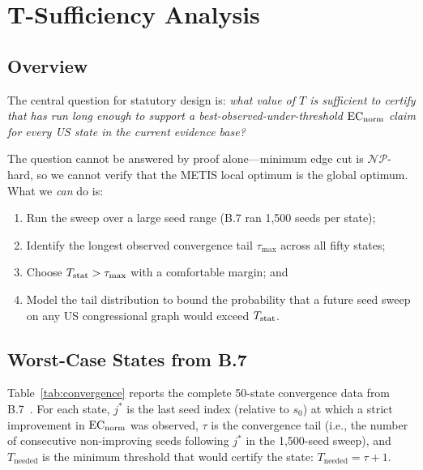 \section{T-Sufficiency Analysis}
\label{sec:sufficiency}

\subsection{Overview}

The central question for statutory design is: \emph{what value of $T$ is
sufficient to certify that \cs{} has run long enough to support a
best-observed-under-threshold $\mathrm{EC}_{\mathrm{norm}}$ claim for every US state in the
current evidence base?}

The question cannot be answered by proof alone---minimum edge cut is
$\mathcal{NP}$-hard, so we cannot verify that the METIS local optimum is the
global optimum.
What we \emph{can} do is:
\begin{enumerate}
\item Run the sweep over a large seed range (B.7 ran 1{,}500 seeds per state);
\item Identify the longest observed convergence tail $\tau_{\max}$ across all
      fifty states;
\item Choose $T_{\mathrm{stat}} > \tau_{\max}$ with a comfortable margin; and
\item Model the tail distribution to bound the probability that a future seed
      sweep on any US congressional graph would exceed $T_{\mathrm{stat}}$.
\end{enumerate}

\subsection{Worst-Case States from B.7}

Table~\ref{tab:convergence} reports the complete 50-state convergence
data from B.7~\citep{b7paper}.
For each state, $j^*$ is the last seed index (relative to $s_0$) at which
a strict improvement in $\mathrm{EC}_{\mathrm{norm}}$ was observed, $\tau$ is the convergence tail
(i.e., the number of consecutive non-improving seeds following $j^*$ in the
1{,}500-seed sweep), and $T_{\mathrm{needed}}$ is the minimum threshold that
would certify the state: $T_{\mathrm{needed}} = \tau + 1$.

